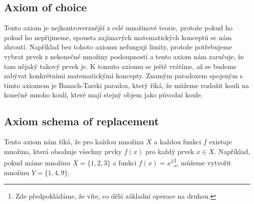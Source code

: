 \subsection{Axiom of choice}
Tento axiom je nejkontroverznější z celé množinové teorie, protože pokud ho pokud ho nepřijmeme, spousta zajímavých matematických konceptů se nám zhroutí. Například bez tohoto axiomu nefungují limity, protože potřebujeme vybrat prvek z nekonečné množiny posloupností a tento axiom nám zaručuje, že tam nějaký takový prvek je. K tomuto axiomu se ještě vrátíme, až se budeme zabývat konkrétními matematickými koncepty. Znamým paradoxem spojeným s tímto axiomem je Banach-Tarski paradox, který říká, že můžeme rozložit kouli na konečně mnoho koulí, které mají stejný objem jako původní koule. 
\subsection{Axiom schema of replacement}
Tento axiom nám říká, že pro každou množinu $X$ a každou funkci $f$ existuje množina, která obsahuje všechny prvky $f(x)$ pro každý prvek $x\in X$. Například, pokud máme množinu $X = \{1, 2, 3\}$ a funkci $f(x) = x^2$\footnote{Zde předpokládáme, že víte, co dělá základní operace na druhou.}, můžeme vytvořit množinu $Y = \{1, 4, 9\}$.

